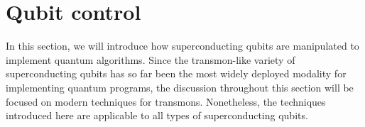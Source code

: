 \documentclass[aip,apr,twocolumn,showpacs,superscriptaddress,groupedaddress,nofootinbib,reprint]{revtex4-1}  %
\begin{document}


\section{\label{sec:QubitControl}Qubit control}
In this section, we will introduce how superconducting qubits are manipulated to implement quantum algorithms. Since the transmon-like variety of superconducting qubits has so far been the most widely deployed modality for implementing quantum programs, the discussion throughout this section will be focused on modern techniques for transmons. Nonetheless, the techniques introduced here are applicable to all types of superconducting qubits.
\end{document}
